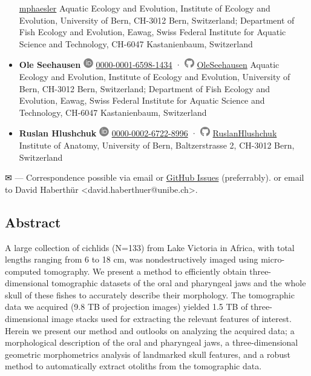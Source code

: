 \begin{itemize}
  \href{https://github.com/mphaesler}{mphaesler}
  Aquatic Ecology and Evolution, Institute of Ecology and Evolution, University of Bern, CH-3012 Bern, Switzerland; Department of Fish Ecology and Evolution, Eawag, Swiss Federal Institute for Aquatic Science and Technology, CH-6047 Kastanienbaum, Switzerland
\item
  \textbf{Ole Seehausen}
  \includegraphics[width=0.16667in,height=0.16667in]{images/orcid.svg}
  \href{https://orcid.org/0000-0001-6598-1434}{0000-0001-6598-1434} ·
  \includegraphics[width=0.16667in,height=0.16667in]{images/github.svg}
  \href{https://github.com/OleSeehausen}{OleSeehausen}
  Aquatic Ecology and Evolution, Institute of Ecology and Evolution, University of Bern, CH-3012 Bern, Switzerland; Department of Fish Ecology and Evolution, Eawag, Swiss Federal Institute for Aquatic Science and Technology, CH-6047 Kastanienbaum, Switzerland
\item
  \textbf{Ruslan Hlushchuk}
  \includegraphics[width=0.16667in,height=0.16667in]{images/orcid.svg}
  \href{https://orcid.org/0000-0002-6722-8996}{0000-0002-6722-8996} ·
  \includegraphics[width=0.16667in,height=0.16667in]{images/github.svg}
  \href{https://github.com/RuslanHlushchuk}{RuslanHlushchuk}
  Institute of Anatomy, University of Bern, Baltzerstrasse 2, CH-3012 Bern, Switzerland
\end{itemize}

\leavevmode{}%
✉ --- Correspondence possible via email or \href{https://github.com/habi/EAWAG-manuscript/issues}{GitHub Issues} (preferrably).
or email to
David Haberthür \textless david.haberthuer@unibe.ch\textgreater.

\hypertarget{abstract}{%
\subsection{Abstract}\label{abstract}}

A large collection of cichlids (N=133) from Lake Victoria in Africa, with total lengths ranging from 6 to 18 cm, was nondestructively imaged using micro-computed tomography.
We present a method to efficiently obtain three-dimensional tomographic datasets of the oral and pharyngeal jaws and the whole skull of these fishes to accurately describe their morphology.
The tomographic data we acquired (9.8 TB of projection images) yielded 1.5 TB of three-dimensional image stacks used for extracting the relevant features of interest.
Herein we present our method and outlooks on analyzing the acquired data; a morphological description of the oral and pharyngeal jaws, a three-dimensional geometric morphometrics analysis of landmarked skull features, and a robust method to automatically extract otoliths from the tomographic data.

